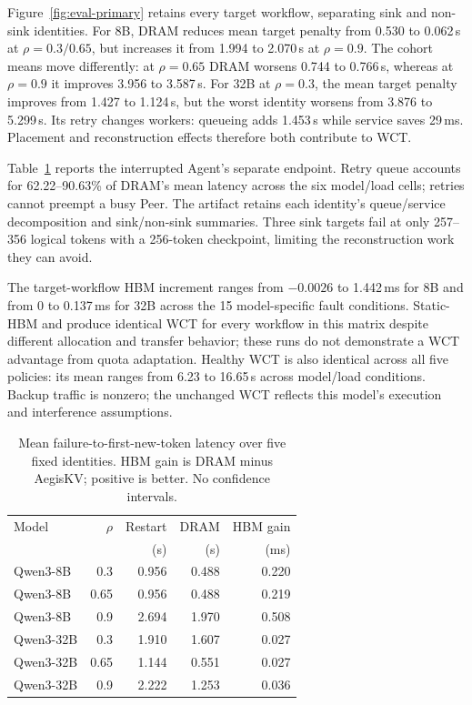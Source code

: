 Figure~\ref{fig:eval-primary} retains every target workflow, separating sink
and non-sink identities. For 8B, DRAM reduces mean target penalty from
0.530 to 0.062\,s at $\rho=0.3/0.65$, but increases it from 1.994 to
2.070\,s at $\rho=0.9$. The cohort means move differently: at $\rho=0.65$
DRAM worsens 0.744 to 0.766\,s, whereas at $\rho=0.9$ it improves 3.956 to
3.587\,s. For 32B at $\rho=0.3$, the mean target penalty improves from
1.427 to 1.124\,s, but the worst identity worsens from 3.876 to 5.299\,s.
Its retry changes workers: queueing adds 1.453\,s while service saves 29\,ms.
Placement and reconstruction effects therefore both contribute to WCT.

Table~\ref{tab:agent-failure-latency} reports the interrupted Agent's separate
endpoint. Retry queue accounts for 62.22--90.63\% of DRAM's mean latency
across the six model/load cells; retries cannot preempt a busy Peer.
The artifact retains
each identity's queue/service decomposition and sink/non-sink summaries.
Three sink targets fail at only 257--356 logical tokens with a 256-token
checkpoint, limiting the reconstruction work they can avoid.

The target-workflow HBM increment ranges from $-0.0026$ to 1.442\,ms for 8B
and from 0 to 0.137\,ms for 32B across the 15 model-specific fault conditions.
Static-HBM and \system produce identical WCT for every workflow in this
matrix despite different allocation and transfer behavior; these runs do not
demonstrate a WCT advantage from quota adaptation. Healthy WCT is also
identical across all five policies: its mean ranges from 6.23 to 16.65\,s
across model/load conditions. Backup traffic is nonzero; the unchanged WCT
reflects this model's execution and interference assumptions.

\begin{table}[t]
\centering
\setlength{\tabcolsep}{3pt}
\renewcommand{\arraystretch}{1.08}
\caption{Mean failure-to-first-new-token latency over five fixed identities.
HBM gain is DRAM minus AegisKV; positive is better. No confidence intervals.}
\label{tab:agent-failure-latency}
\begin{tabular}{@{}lrrrr@{}}
\hline
Model & $\rho$ & Restart & DRAM & HBM gain \\
 & & (s) & (s) & (ms) \\
\hline
Qwen3-8B & 0.3 & 0.956 & 0.488 & 0.220 \\
Qwen3-8B & 0.65 & 0.956 & 0.488 & 0.219 \\
Qwen3-8B & 0.9 & 2.694 & 1.970 & 0.508 \\
Qwen3-32B & 0.3 & 1.910 & 1.607 & 0.027 \\
Qwen3-32B & 0.65 & 1.144 & 0.551 & 0.027 \\
Qwen3-32B & 0.9 & 2.222 & 1.253 & 0.036 \\
\hline
\end{tabular}
\end{table}

